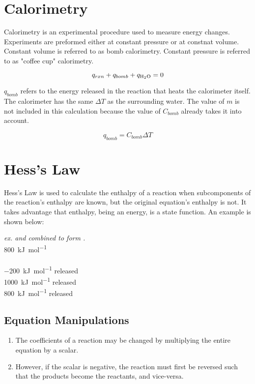 \section{Calorimetry}
Calorimetry is an experimental procedure used to measure energy changes.
Experiments are preformed either at constant pressure or at constnat volume.
Constant volume is referred to as bomb calorimetry. Constant pressure is
referred to as "coffee cup" calorimetry.

\begin{equation}
  q_{rxn} + q_{bomb} + q_{\ce{H2O}} = 0
\end{equation}

$q_{bomb}$ refers to the energy released in the reaction that heats the
calorimeter itself. The calorimeter has the same $\Delta T$ as the surrounding
water. The value of $m$ is not included in this calculation because the value of
$C_{bomb}$ already takes it into account.

\begin{equation}
  q_{bomb} = C_{bomb}\Delta T
\end{equation}

\section{Hess's Law}
Hess's Law is used to calculate the enthalpy of a reaction when subcomponents of
the reaction's enthalpy are known, but the original equation's enthalpy is not.
It takes advantage that enthalpy, being an energy, is a state function. An
example is shown below:

\textit{ex.  and  combined to form .}\\
 \SI{800}{\kilo\joule\per\mol}\\\\

 \SI{-200}{\kilo\joule\per\mol} released\\
 \SI{1000}{\kilo\joule\per\mol} released\\
\SI{800}{\kilo\joule\per\mol} released

\subsection{Equation Manipulations}
\begin{enumerate}
  \item The coefficients of a reaction may be changed by multiplying the entire
    equation by a scalar.
  \item However, if the scalar is negative, the reaction must first be reversed
    such that the products become the reactants, and vice-versa.
\end{enumerate}


